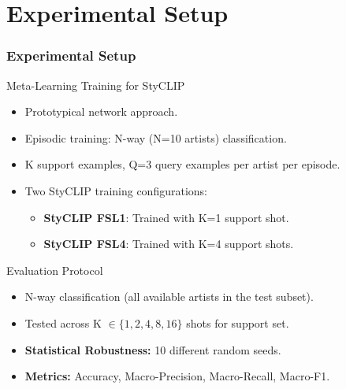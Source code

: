 \documentclass{beamer}
\begin{document}
\section{Experimental Setup}
\begin{frame}
  \frametitle{Experimental Setup}
  \begin{block}{Meta-Learning Training for StyCLIP}
    \begin{itemize}
      \item Prototypical network approach.
      \item Episodic training: N-way (N=10 artists) classification.
      \item K support examples, Q=3 query examples per artist per episode.
      \item Two StyCLIP training configurations:
        \begin{itemize}
          \item \textbf{StyCLIP FSL1}: Trained with K=1 support shot.
          \item \textbf{StyCLIP FSL4}: Trained with K=4 support shots.
        \end{itemize}
    \end{itemize}
  \end{block}

  \begin{block}{Evaluation Protocol}
    \begin{itemize}
      \item N-way classification (all available artists in the test subset).
      \item Tested across K $\in \{1, 2, 4, 8, 16\}$ shots for support set.
      \item \textbf{Statistical Robustness:} 10 different random seeds.
      \item \textbf{Metrics:} Accuracy, Macro-Precision, Macro-Recall, Macro-F1.
    \end{itemize}
  \end{block}
\end{frame}
\end{document}
